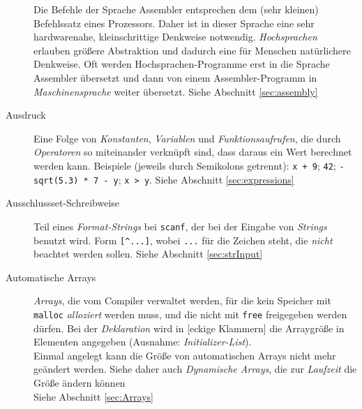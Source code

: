 \begin{appendices}
\begin{description}
	Die Befehle der Sprache Assembler entsprechen dem (sehr kleinen) Befehlssatz eines Prozessors. Daher
	ist in dieser Sprache eine sehr hardwarenahe, kleinschrittige Denkweise notwendig.\newline
	\emph{Hochsprachen} erlauben größere Abstraktion und dadurch eine für Menschen natürlichere
	Denkweise. Oft werden Hochsprachen-Programme erst in die Sprache Assembler übersetzt und dann von
	einem Assembler-Programm in \emph{Maschinensprache} weiter übersetzt.\newline
	Siehe Abschnitt \ref{sec:assembly}
\item[Ausdruck] Eine Folge von \emph{Konstanten}, \emph{Variablen} und \emph{Funktionsaufrufen}, die
	durch \emph{Operatoren} so miteinander verknüpft sind, dass daraus ein Wert berechnet werden kann.
	\newline
	Beispiele (jeweils durch Semikolons getrennt): \texttt{x + 9}; \texttt{42}; 
	\texttt{-sqrt(5.3) * 7 - y}; \texttt{x > y}.\newline
	Siehe Abschnitt \ref{sec:expressions}
\item[Ausschlussset-Schreibweise] Teil eines \emph{Format-Strings} bei \texttt{scanf}, der bei der
	Eingabe von \emph{Strings} benutzt wird. Form \texttt{[^...]}, wobei \texttt{...} für die
	Zeichen steht, die \emph{nicht} beachtet werden sollen.\newline
	Siehe Abschnitt \ref{sec:strInput}
\item[Automatische Arrays] \emph{Arrays}, die vom Compiler verwaltet werden, \ie für die kein
	Speicher mit \texttt{malloc} \emph{alloziert} werden muss, und die nicht mit \texttt{free}
	freigegeben werden dürfen. Bei der \emph{Deklaration} wird in [eckige Klammern] die Arraygröße in
	Elementen angegeben (Ausnahme: \emph{Initializer-List}).\\
	Einmal angelegt kann die Größe von automatischen Arrays nicht mehr geändert werden. Siehe daher auch 
	\emph{Dynamische Arrays}, die zur \emph{Laufzeit} die Größe ändern können\\
	Siehe Abschnitt \ref{sec:Arrays}


\end{description}
\end{appendices}
